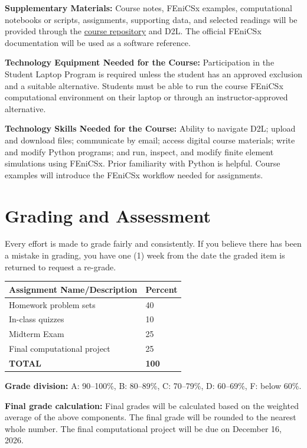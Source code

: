 \documentclass[12pt]{article}
\newcommand{\coursefield}[2]{%
  \vspace{0.2em}\noindent\textbf{#1} #2\par
}
\begin{document}
\coursefield{Supplementary Materials:}{Course notes, FEniCSx examples, computational notebooks or scripts, assignments, supporting data, and selected readings will be provided through the \href{https://github.com/CEADpx/finite-element-methods}{course repository} and D2L. The official FEniCSx documentation will be used as a software reference.}

\coursefield{Technology Equipment Needed for the Course:}{Participation in the Student Laptop Program is required unless the student has an approved exclusion and a suitable alternative. Students must be able to run the course FEniCSx computational environment on their laptop or through an instructor-approved alternative.}

\coursefield{Technology Skills Needed for the Course:}{Ability to navigate D2L; upload and download files; communicate by email; access digital course materials; write and modify Python programs; and run, inspect, and modify finite element simulations using FEniCSx. Prior familiarity with Python is helpful. Course examples will introduce the FEniCSx workflow needed for assignments.}

\section{Grading and Assessment}
Every effort is made to grade fairly and consistently. If you believe there has been a mistake in grading, you have one (1) week from the date the graded item is returned to request a re-grade.

\vspace{0.2em}
{\small
\setlength{\tabcolsep}{5pt}
\renewcommand{\arraystretch}{1.13}
\begin{tabular}{|L{5.28in}|C{0.92in}|}
\hline
\textbf{Assignment Name/Description} & \textbf{Percent}\\
\hline
Homework problem sets & 40\\
\hline
In-class quizzes & 10\\
\hline
Midterm Exam & 25\\
\hline
Final computational project & 25\\
\hline
\textbf{TOTAL} & \textbf{100}\\
\hline
\end{tabular}
}

\coursefield{Grade division:}{A: 90--100\%, B: 80--89\%, C: 70--79\%, D: 60--69\%, F: below 60\%.}

\coursefield{Final grade calculation:}{Final grades will be calculated based on the weighted average of the above components. The final grade will be rounded to the nearest whole number. The final computational project will be due on December 16, 2026.}
\end{document}

